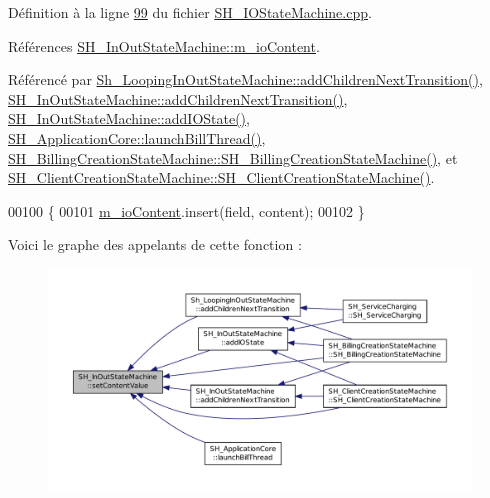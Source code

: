 Définition à la ligne \hyperlink{SH__IOStateMachine_8cpp_source_l00099}{99} du fichier \hyperlink{SH__IOStateMachine_8cpp_source}{S\-H\-\_\-\-I\-O\-State\-Machine.\-cpp}.



Références \hyperlink{classSH__InOutStateMachine_a661a1c7bd3b1086b3b5cd60ca957ecbd}{S\-H\-\_\-\-In\-Out\-State\-Machine\-::m\-\_\-io\-Content}.



Référencé par \hyperlink{classSh__LoopingInOutStateMachine_acfd8d0711c793b13c759f6c50be6a315}{Sh\-\_\-\-Looping\-In\-Out\-State\-Machine\-::add\-Children\-Next\-Transition()}, \hyperlink{classSH__InOutStateMachine_a689e5513ef6ef3fc1598efacd413372e}{S\-H\-\_\-\-In\-Out\-State\-Machine\-::add\-Children\-Next\-Transition()}, \hyperlink{classSH__InOutStateMachine_ad6b778d052f741daee720c047059ce0e}{S\-H\-\_\-\-In\-Out\-State\-Machine\-::add\-I\-O\-State()}, \hyperlink{classSH__ApplicationCore_a17a048025bc51a96663029e58c722741}{S\-H\-\_\-\-Application\-Core\-::launch\-Bill\-Thread()}, \hyperlink{classSH__BillingCreationStateMachine_ad62b77fa4aeafe200056ff3974562f83}{S\-H\-\_\-\-Billing\-Creation\-State\-Machine\-::\-S\-H\-\_\-\-Billing\-Creation\-State\-Machine()}, et \hyperlink{classSH__ClientCreationStateMachine_a0b406b0f404c0fd33bf35be8ce0cc811}{S\-H\-\_\-\-Client\-Creation\-State\-Machine\-::\-S\-H\-\_\-\-Client\-Creation\-State\-Machine()}.


\begin{DoxyCode}
00100 \{
00101     \hyperlink{classSH__InOutStateMachine_a661a1c7bd3b1086b3b5cd60ca957ecbd}{m\_ioContent}.insert(field, content);
00102 \}
\end{DoxyCode}


Voici le graphe des appelants de cette fonction \-:\nopagebreak
\begin{figure}[H]
\begin{center}
\leavevmode
\includegraphics[width=350pt]{classSH__InOutStateMachine_aa2766b7a7ba39c35a10df7fc0c151b4f_icgraph}
\end{center}
\end{figure}


